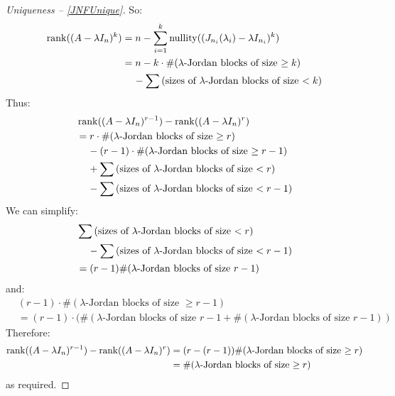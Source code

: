 \documentclass[../main.tex]{subfiles}
\begin{document}
\begin{proof}[Uniqueness -- \cref{JNFUnique}]
  So:
  \begin{align*}
    \operatorname{rank}((A - \lambda I_n)^{k}) &= n - \sum_{i = 1}^{k} \operatorname{nullity}((J_{n_i}(\lambda_i) - \lambda I_{n_i})^k) \\
                                 &= n - k \cdot \#(\text{$\lambda$-Jordan blocks of size $\geq k$}) \\
                                 &\hspace{0.4cm} - \sum \text{(sizes of $\lambda$-Jordan blocks of size $< k$)}
  \end{align*}
  Thus:
  \begin{align*}
    &\operatorname{rank}((A - \lambda I_n)^{r - 1}) - \operatorname{rank}((A - \lambda I_n)^{r}) \\
    &= r \cdot \#(\text{$\lambda$-Jordan blocks of size $\geq r$}) \\
    &\hspace{0.4cm} - (r - 1) \cdot \#(\text{$\lambda$-Jordan blocks of size $\geq r - 1$}) \\
    &\hspace{0.4cm} + \sum \text{(sizes of $\lambda$-Jordan blocks of size $< r$)} \\
    &\hspace{0.4cm} - \sum \text{(sizes of $\lambda$-Jordan blocks of size $< r - 1$)}
  \end{align*}
  We can simplify:
  \begin{align*}
    &\sum \text{(sizes of $\lambda$-Jordan blocks of size $< r$)} \\
    &\hspace{0.4cm} - \sum \text{(sizes of $\lambda$-Jordan blocks of size $< r - 1$)} \\
    &= (r - 1) \#(\text{$\lambda$-Jordan blocks of size $r - 1$})
  \end{align*}
  and:
  \begin{align*}
    &(r - 1) \cdot \#(\text{$\lambda$-Jordan blocks of size $\geq r - 1$}) \\
    &= (r - 1)  \cdot (\#(\text{$\lambda$-Jordan blocks of size $r - 1$} + \#(\text{$\lambda$-Jordan blocks of size $r - 1$}))
  \end{align*}
  Therefore:
  \begin{align*}
    \operatorname{rank}((A - \lambda I_n)^{r - 1}) - \operatorname{rank}((A - \lambda I_n)^{r}) &= (r - (r - 1)) \#(\text{$\lambda$-Jordan blocks of size $\geq r$}) \\
                                                                    &= \#(\text{$\lambda$-Jordan blocks of size $\geq r$})
  \end{align*}
  as required.
\end{proof}
\end{document}
